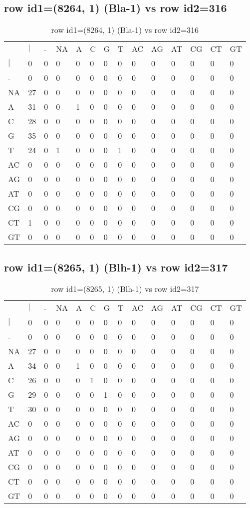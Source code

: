 \subsection{row id1=(8264, 1) (Bla-1) vs row id2=316}
\begin{center}
\begin{longtable}{|l|l|l|l|l|l|l|l|l|l|l|l|l|l|}
\caption{row id1=(8264, 1) (Bla-1) vs row id2=316} \label{table_dm220}\\
\hline
\\
\hline
&$|$&-&NA&A&C&G&T&AC&AG&AT&CG&CT&GT\\
$|$&0&0&0&0&0&0&0&0&0&0&0&0&0\\
-&0&0&0&0&0&0&0&0&0&0&0&0&0\\
NA&27&0&0&0&0&0&0&0&0&0&0&0&0\\
A&31&0&0&1&0&0&0&0&0&0&0&0&0\\
C&28&0&0&0&0&0&0&0&0&0&0&0&0\\
G&35&0&0&0&0&0&0&0&0&0&0&0&0\\
T&24&0&1&0&0&0&1&0&0&0&0&0&0\\
AC&0&0&0&0&0&0&0&0&0&0&0&0&0\\
AG&0&0&0&0&0&0&0&0&0&0&0&0&0\\
AT&0&0&0&0&0&0&0&0&0&0&0&0&0\\
CG&0&0&0&0&0&0&0&0&0&0&0&0&0\\
CT&1&0&0&0&0&0&0&0&0&0&0&0&0\\
GT&0&0&0&0&0&0&0&0&0&0&0&0&0\\
\hline
\end{longtable}
\end{center}

\subsection{row id1=(8265, 1) (Blh-1) vs row id2=317}
\begin{center}
\begin{longtable}{|l|l|l|l|l|l|l|l|l|l|l|l|l|l|}
\caption{row id1=(8265, 1) (Blh-1) vs row id2=317} \label{table_dm222}\\
\hline
\\
\hline
&$|$&-&NA&A&C&G&T&AC&AG&AT&CG&CT&GT\\
$|$&0&0&0&0&0&0&0&0&0&0&0&0&0\\
-&0&0&0&0&0&0&0&0&0&0&0&0&0\\
NA&27&0&0&0&0&0&0&0&0&0&0&0&0\\
A&34&0&0&1&0&0&0&0&0&0&0&0&0\\
C&26&0&0&0&1&0&0&0&0&0&0&0&0\\
G&29&0&0&0&0&1&0&0&0&0&0&0&0\\
T&30&0&0&0&0&0&0&0&0&0&0&0&0\\
AC&0&0&0&0&0&0&0&0&0&0&0&0&0\\
AG&0&0&0&0&0&0&0&0&0&0&0&0&0\\
AT&0&0&0&0&0&0&0&0&0&0&0&0&0\\
CG&0&0&0&0&0&0&0&0&0&0&0&0&0\\
CT&0&0&0&0&0&0&0&0&0&0&0&0&0\\
GT&0&0&0&0&0&0&0&0&0&0&0&0&0\\
\hline
\end{longtable}
\end{center}

